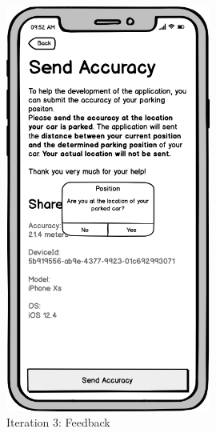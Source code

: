 \begin{figure}[H]
  \centering
  \begin{minipage}[b]{0.45\textwidth}
    \centering
    \includegraphics[width=0.6\textwidth]{images/UI/Iteration3-Feedback-Confirmation.png}
    \caption{Iteration 3: Feedback}
    \label{fig:i3-feedback-con}
  \end{minipage}
  \hfill
  \begin{minipage}[b]{0.45\textwidth}
    \centering

\end{minipage}
\end{figure}
